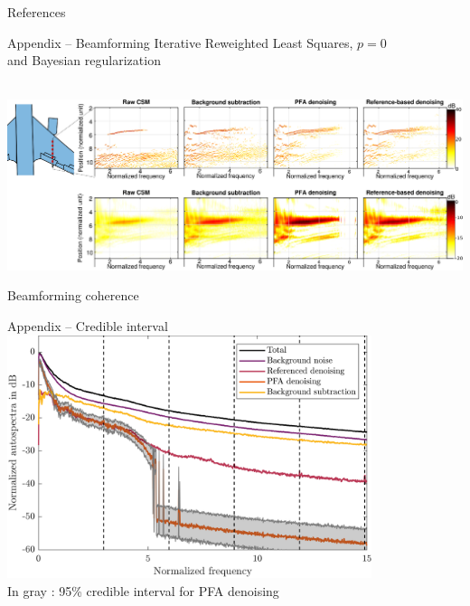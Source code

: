 \documentclass[10pt,xcolor=x11names,compress, show notes]{beamer}%
\begin{document}
\appendix
\begin{frame}{References}
		\setlength{\bibsep}{2em}
		
		
\end{frame}
\setcounter{finalframe}{\value{framenumber}}

\begin{frame}{Appendix -- Beamforming}
	\centering
	\footnotesize Iterative Reweighted Least Squares, $p=0$ \\ and Bayesian regularization\\~\\
	\begin{minipage}{1.1\textwidth}
			\hspace{-0.65cm}\includegraphics[width=1\textwidth]{airbus/imagerie_final.eps}\\
\end{minipage}

	Beamforming coherence

\end{frame}

\begin{frame}{Appendix -- Credible interval}
\centering
\includegraphics[width=0.8\textwidth]{ic_95pc.png}\\
In gray : 95\% credible interval for PFA denoising
\end{frame}
\setcounter{framenumber}{\value{finalframe}}
\end{document}
